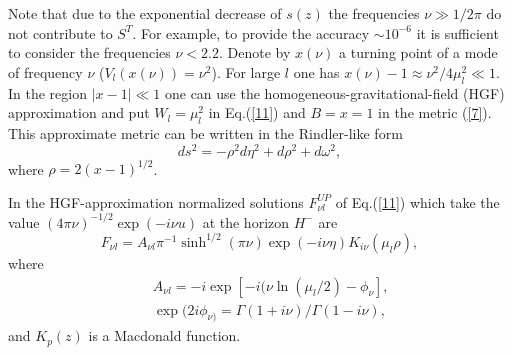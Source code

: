 \documentclass[superscriptaddress,showpacs,preprintnumbers,amsmath,amssymb,
nofootinbib,twocolumn,aps,prd,10pt]{revtex4-1}
\begin{document}
Note  that due to  the exponential decrease of $s(z)$  the frequencies
$\nu \gg  1/2\pi$ do  not contribute   to   $S^T$.   For example, to
provide  the accuracy  $\sim 10^{-6}$ it is sufficient to consider the
frequencies $\nu <2.2$. Denote by $x(\nu )$ a turning point of a mode
of frequency $\nu$ ($V_l (x(\nu ))=\nu^2$).  For  large  $l$ one has
$x(\nu )-1\approx \nu ^2  /4\mu_l^2 \ll 1$. In the region $|x-1|\ll
1$ one  can  use the homogeneous-gravitational-field  (HGF)
approximation   and   put $W_l  =\mu_l^2$  in  Eq.(\ref{11})  and  $B=x=1$
in  the metric (\ref{7}). This approximate metric can be written in the
Rindler-like form
\begin{equation}
ds^2 =-\rho^2 d\eta^2 +d\rho^2 +d\omega^2, \label{28a}
\end{equation}
where $\rho =2(x-1)^{1/2}$.

In the HGF-approximation normalized solutions $F_{\nu l}^{UP}$
of Eq.(\ref{11}) which take the value $(4\pi \nu )^{-1/2}\exp (-i\nu u)$
at the horizon $H^-$ are
\begin{equation}
F_{\nu l}=A_{\nu l}\pi ^{-1}\sinh ^{1/2}(\pi \nu )
\exp (-i\nu \eta ) K_{i\nu}(\mu _l \rho ) ,
\label{25}
\end{equation}
where
\begin{eqnarray}
&&A_{\nu l} =-i \exp [-i (\nu \ln (\mu _l /2)-\phi _{\nu}], \nonumber\\
&&\exp (2i \phi _{\nu)}=\Gamma (1+i\nu )/\Gamma (1- i\nu ),
\label{26}
\end{eqnarray}
and $K_p (z)$ is a Macdonald function.
\end{document}

